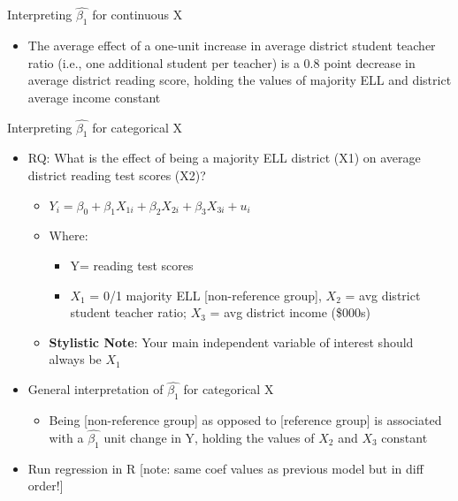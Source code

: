 \documentclass[
  8pt,
  ignorenonframetext,
  dvipsnames]{beamer}
\providecommand{\tightlist}{%
  \setlength{\itemsep}{0pt}\setlength{\parskip}{0pt}}
\renewcommand{\textbf}[1]{{\color{darkgray}\bfseries\fontfamily{Montserrat-TOsF}#1}}
\let\olditem\item
\renewcommand{\item}{%
  \olditem\vspace{4pt}
}
\begin{document}
\begin{frame}{Interpreting \(\hat{\beta_1}\) for continuous X}
\begin{itemize}
  \begin{itemize}
  \tightlist
  \item
    The average effect of a one-unit increase in average district
    student teacher ratio (i.e., one additional student per teacher) is
    a 0.8 point decrease in average district reading score, holding the
    values of majority ELL and district average income constant
  \end{itemize}
\end{itemize}

\end{frame}

\begin{frame}[fragile]{Interpreting \(\hat{\beta_1}\) for categorical X}
\protect\hypertarget{interpreting-hatbeta_1-for-categorical-x}{}

\begin{itemize}
\tightlist
\item
  RQ: What is the effect of being a majority ELL district (X1) on
  average district reading test scores (X2)?

  \begin{itemize}
  \tightlist
  \item
    \(Y_i = \beta_0 + \beta_1X_{1i} + \beta_2X_{2i} + \beta_3X_{3i} + u_i\)
  \item
    Where:

    \begin{itemize}
    \tightlist
    \item
      Y= reading test scores
    \item
      \(X_1\) = 0/1 majority ELL {[}non-reference group{]}, \(X_2\) =
      avg district student teacher ratio; \(X_3\) = avg district income
      (\$000s)
    \end{itemize}
  \item
    \textbf{Stylistic Note}: Your main independent variable of interest
    should always be \(X_1\)
  \end{itemize}
\item
  General interpretation of \(\hat{\beta_1}\) for categorical X

  \begin{itemize}
  \tightlist
  \item
    Being {[}non-reference group{]} as opposed to {[}reference group{]}
    is associated with a \(\hat{\beta_1}\) unit change in Y, holding the
    values of \(X_2\) and \(X_3\) constant
  \end{itemize}
\item
  Run regression in R {[}note: same coef values as previous model but in
  diff order!{]}


\end{itemize}
\end{frame}
\end{document}
